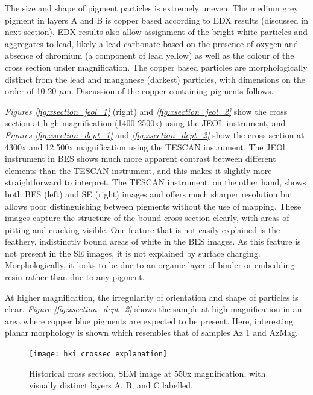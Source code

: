 The size and shape of pigment particles is extremely uneven. The medium grey pigment in layers A and B is copper based according to EDX results (discussed in next section). EDX results also allow assignment of the bright white particles and aggregates to lead, likely a lead carbonate based on the presence of oxygen and absence of chromium (a component of lead yellow) as well as the colour of the cross section under magnification. The copper based particles are morphologically distinct from the lead and manganese (darkest) particles, with dimensions on the order of 10-20 $\mu$m. Discussion of the copper containing pigments follows.

\textit{Figures \ref{fig:xsection_jeol_1}} (right) and \textit{\ref{fig:xsection_jeol_2}} show the cross section at high magnification (1400-2500x) using the JEOL instrument, and \textit{Figures \ref{fig:xsection_dept_1}} and \textit{\ref{fig:xsection_dept_2}} show the cross section at 4300x and 12,500x magnification using the TESCAN instrument. The JEOl instrument in BES shows much more apparent contrast between different elements than the TESCAN instrument, and this makes it slightly more straightforward to interpret. The TESCAN instrument, on the other hand, shows both BES (left) and SE (right) images and offers much sharper resolution but allows poor distinguishing between pigments without the use of mapping. These images capture the structure of the bound cross section clearly, with areas of pitting and cracking visible. One feature that is not easily explained is the feathery, indistinctly bound areas of white in the BES images. As this feature is not present in the SE images, it is not explained by surface charging. Morphologically, it looks to be due to an organic layer of binder or embedding resin rather than due to any pigment.

At higher magnification, the irregularity of orientation and shape of particles is clear. \textit{Figure \ref{fig:xsection_dept_2}} shows the sample at high magnification in an area where copper blue pigments are expected to be present. Here, interesting planar morphology is shown which resembles that of samples Az 1 and AzMag.

\begin{figure}[H]
\centering
  \texttt{[image: hki\_crossec\_explanation]}
\caption[Historical cross section with visually distinct layers A, B, and C labelled]{Historical cross section, SEM image at 550x magnification, with visually distinct layers A, B, and C labelled.}
\label{fig:hki_crossec_explanation}
\end{figure}

